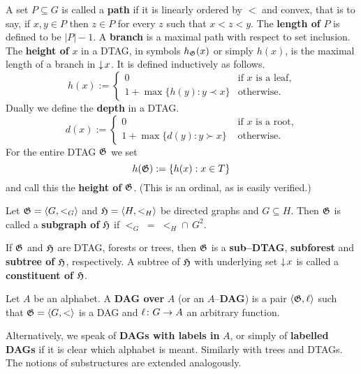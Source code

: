 A set $P \subseteq G$ is called a \textbf{path} if it is linearly
ordered by $<$ and convex, that is to say, if $x, y \in P$ then
$z \in P$ for every $z$ such that $x < z < y$.  The \textbf{length of}
$P$ is defined to be $|P| - 1$. A \textbf{branch} is a maximal path 
with respect to set inclusion.
The \textbf{height of} $x$ in a DTAG, in symbols $h_{\mathfrak{G}}(x)$ or
simply $h(x)$, is the maximal length of a branch in ${\downarrow\! x}$.
It is defined inductively as follows.
\begin{equation}
h(x) := \begin{cases}
      0 & \text{if $x$ is a leaf,} \\
      1 + \max \{h(y) : y \prec x\} 
      & \text{otherwise.}
\end{cases}
\end{equation}
Dually we define the \textbf{depth} in a DTAG.
\begin{equation}
d(x) := 
\begin{cases}
0 &  \text{ if $x$ is a root,} \\
1 + \max \{d(y) : y \succ x\}  &
    \mbox{ otherwise.}
\end{cases}
\end{equation}
For the entire DTAG $\mathfrak{G}$ we set
\begin{equation}
h(\mathfrak{G}) := \{h(x) : x \in T\} 
\end{equation}
and call this the \textbf{height of} $\mathfrak{G}$. (This is an ordinal, 
as is easily verified.)
\begin{defn}
Let $\mathfrak{G} = \langle G, <_G\rangle$ and $\mathfrak{H} = \langle H, <_H\rangle$
be directed graphs and $G \subseteq H$. Then $\mathfrak{G}$ is called
a \textbf{subgraph of} $\mathfrak{H}$ if $<_G\; = \; <_H \cap\, G^2$.
\end{defn}
If $\mathfrak{G}$ and $\mathfrak{H}$ are DTAG, forests or trees, then $\mathfrak{G}$ is
a \textbf{sub--DTAG}, \textbf{subforest} and \textbf{subtree of}
$\mathfrak{H}$, respectively. A subtree of $\mathfrak{H}$ with underlying set ${\downarrow\! x}$ 
is called a \textbf{constituent of} $\mathfrak{H}$.
\begin{defn}
Let $A$ be an alphabet. A \textbf{DAG over} $A$ (or an $A$--\textbf{DAG})
is a pair $\langle \mathfrak{G}, \ell\rangle$ such that $\mathfrak{G} = \langle G, <\rangle$ is
a DAG and $\ell \colon G \rightarrow A$ an arbitrary function.
\end{defn}
Alternatively, we speak of \textbf{DAGs with labels in} $A$, or simply 
of \textbf{labelled DAGs} if it is clear which alphabet is meant. 
Similarly with trees and DTAGs. The notions of substructures are extended 
analogously.


